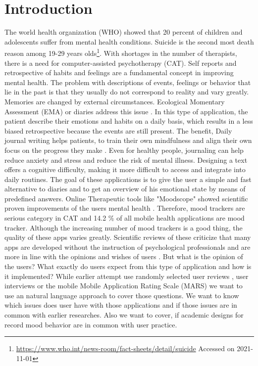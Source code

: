 \chapter{Introduction}
\label{ch:introduction}
The world health organization (WHO) showed that 20 percent of children and adolescents suffer from mental health conditions. 
Suicide is the second most death reason among 19-29 years olds\footnote{\url{https://www.who.int/news-room/fact-sheets/detail/suicide} Accessed on 2021-11-01}.
With shortages in the number of therapists, there is a need for computer-assisted psychotherapy (CAT). 
Self reports and retrospective of habits and feelings are a fundamental concept in improving mental health.
The problem with descriptions of events, feelings or behavior that lie in the past is that they usually do not correspond to reality and vary greatly. 
Memories are changed by external circumstances.
Ecological Momentary Assessment (EMA) or diaries address this issue \cite{shiffman2008ecological}.
In this type of application, the patient describe their emotions and habits on a daily basis, which results in a less biased retrospective because the events are still present.
The benefit, Daily journal writing helps patients, to train their own mindfulness and align their own focus on the progress they make \cite{hiraga2019effects}.
Even for healthy people, journaling can help reduce anxiety and stress and reduce the risk of mental illness.
Designing a text offers a cognitive difficulty, making it more difficult to access and integrate into daily routines.
The goal of these applications is to give the user a simple and fast alternative to diaries and to get an overview of his emotional state by means of predefined answers.
Online Therapeutic tools like "Moodscope" showed scientific proven improvements of the users mental health \cite{drake2013assessing}. Therefore, mood trackers are serious category in CAT and 14.2 \% of all mobile health applications are mood tracker.
Although the increasing number of mood trackers is a good thing, the quality of these apps varies greatly. 
Scientific reviews of these criticize that many apps are developed without the instruction of psychological professionals and are more in line with the opinions and wishes of users \cite{caldeira2017mobile}\cite{schueller2021understanding}.
But what is the opinion of the users? 
What exactly do users expect from this type of application and how is it implemented? 
While earlier attempt use randomly selected user reviews \cite{caldeira2017mobile}, user interviews \cite{schueller2021understanding} or the mobile Mobile Application Rating Scale (MARS) \cite{myers2020evaluating} we want to use an natural language approach to cover those questions. 
We want to know which issues does user have with those applications and if those issues are in common with earlier researches. Also we want to cover, if academic designs for record mood behavior are in common with user practice. 
